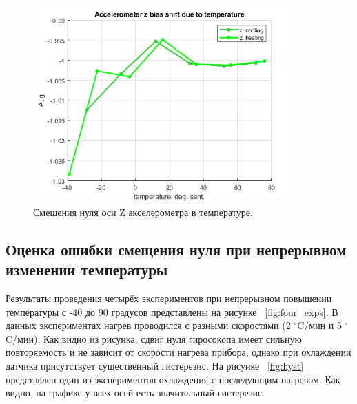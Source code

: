 \documentclass[a4paper,12pt]{article}
\begin{document}
\begin{figure}
\centering
\includegraphics[width=0.9\textwidth]{Az_accel.png} 
\caption{\label{fig:Az_accel} Смещения нуля оси Z акселерометра в температуре.}
\end{figure}

\subsection{Оценка ошибки смещения нуля при непрерывном изменении температуры}

Результаты проведения четырёх экспериментов при непрерывном повышении температуры с -40 до 90 градусов представлены на рисунке ~\ref{fig:four_exps}. В данных экспериментах нагрев проводился с разными скоростями (2 $^{\circ}$C/мин и 5 $^{\circ}$C/мин). Как видно из рисунка, сдвиг нуля гиросокопа имеет сильную повторяемость и не зависит от скорости нагрева прибора, однако при охлаждении датчика присутствует существенный гистерезис. На рисунке ~\ref{fig:hyst} представлен один из экспериментов охлаждения с последующим нагревом. Как видно, на графике у всех осей есть значительный гистерезис.
\end{document}
